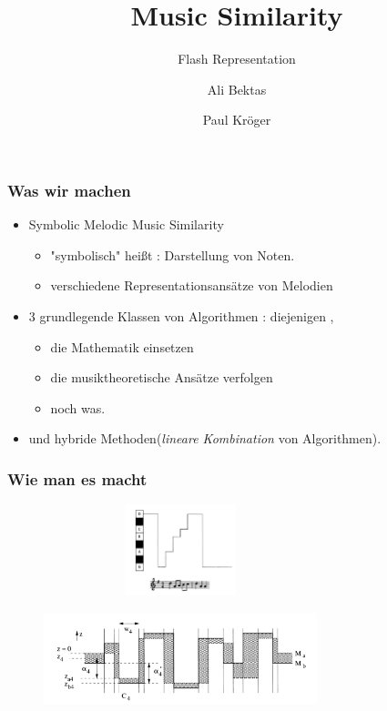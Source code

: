 \documentclass{beamer}
\title{Music Similarity}
\subtitle{Flash Representation}
\author{Ali Bektas \and Paul Kröger}
\begin{document}
	\begin{frame}
		\maketitle
	\end{frame}
	\begin{frame}
  		\frametitle{Was wir machen}
  		\begin{itemize}
  			\item Symbolic Melodic Music Similarity 
  			\begin{itemize}
  				\item "symbolisch" heißt : Darstellung von Noten.
  				\item verschiedene Representationsansätze von Melodien 
  			\end{itemize} 
			\item 3 grundlegende Klassen von Algorithmen : diejenigen ,
			\begin{itemize}
				\item die Mathematik einsetzen
				\item die musiktheoretische Ansätze verfolgen
				\item noch was.
			\end{itemize}
			\item und hybride Methoden(\textit{lineare Kombination} von Algorithmen).
  		\end{itemize}
	\end{frame}
	\begin{frame}
  		\frametitle{Wie man es macht}
  		\begin{figure}[h!]
					\includegraphics[width=300px,height=100px,keepaspectratio]{abb_1}
		\end{figure}
		\begin{figure}[h!]
					\includegraphics[width=300px,height=100px,keepaspectratio]{abb_2}
		\end{figure}
	\end{frame}
\end{document}
